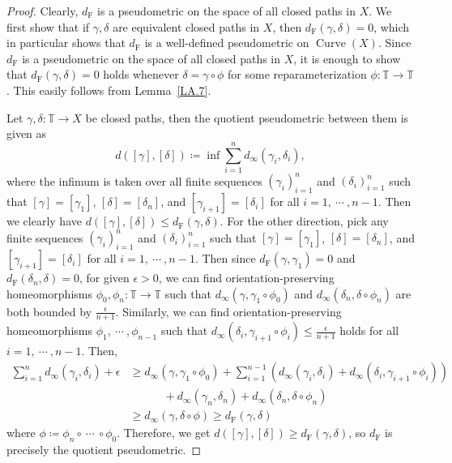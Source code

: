 \documentclass[reqno,centertags,12pt]{amsart}
\theoremstyle{definition}
\numberwithin{equation}{section}
\newcommand{\seq}[1]{\left( #1 \right)}
\newcommand{\bbT}{{\mathbb{T}}}
\begin{document}
\begin{proof}
	Clearly, $d_{\mathrm{F}}$ is a pseudometric on the space of all closed paths in $X$.
	We first show that if $\gamma,\delta$ are equivalent closed paths in $X$, then
	$d_{\mathrm{F}}(\gamma,\delta) = 0$, which in particular shows that $d_{\mathrm{F}}$ is
	a well-defined pseudometric on $\operatorname{Curve}(X)$.
	Since $d_{\mathrm{F}}$ is a pseudometric on the space of all closed paths in $X$,
	it is enough to show that $d_{\mathrm{F}}(\gamma,\delta) = 0$ holds whenever
	$\delta = \gamma\circ\phi$ for some reparameterization $\phi\colon\bbT\to\bbT$.
	This easily follows from Lemma~\ref{LA.7}.

	Let $\gamma,\delta\colon\bbT\to X$ be closed paths, then the quotient pseudometric
	between them is given as
	\[
		d([\gamma],[\delta])\coloneqq \inf \sum_{i=1}^{n}d_{\infty}(\gamma_{i},\delta_{i}),
	\]
	where the infimum is taken over all finite sequences $\seq{\gamma_{i}}_{i=1}^{n}$
	and $\seq{\delta_{i}}_{i=1}^{n}$ such that $[\gamma]=[\gamma_{1}]$,
	$[\delta]=[\delta_{n}]$, and $[\gamma_{i+1}]=[\delta_{i}]$ for all $i=1,\ \cdots\ ,n-1$.
	Then we clearly have $d([\gamma],[\delta])\leq d_{\mathrm{F}}(\gamma,\delta)$.
	For the other direction, pick any finite sequences $\seq{\gamma_{i}}_{i=1}^{n}$ and
	$\seq{\delta_{i}}_{i=1}^{n}$ such that $[\gamma]=[\gamma_{1}]$, $[\delta]=[\delta_{n}]$,
	and $[\gamma_{i+1}]=[\delta_{i}]$ for all $i=1,\ \cdots\ ,n-1$.
	Then since $d_{\mathrm{F}}(\gamma,\gamma_{1}) = 0$
	and $d_{\mathrm{F}}(\delta_{n},\delta) = 0$, for given $\epsilon>0$, we can find
	orientation-preserving homeomorphisms $\phi_{0},\phi_{n}\colon\bbT\to\bbT$ such that
	$d_{\infty}(\gamma,\gamma_{1}\circ\phi_{0})$ and
	$d_{\infty}(\delta_{n},\delta\circ\phi_{n})$ are
	both bounded by $\frac{\epsilon}{n+1}$. Similarly, we can find orientation-preserving
	homeomorphisms $\phi_{1},\ \cdots\ ,\phi_{n-1}$ such that
	$d_{\infty}(\delta_{i},\gamma_{i+1}\circ\phi_{i}) \leq \frac{\epsilon}{n+1}$ holds
	for all $i=1,\ \cdots\ ,n-1$. Then,
	\begin{align*}
		\sum_{i=1}^{n}d_{\infty}(\gamma_{i},\delta_{i}) + \epsilon &\geq
		d_{\infty}(\gamma,\gamma_{1}\circ\phi_{0}) +
		\sum_{i=1}^{n-1}\left(
			d_{\infty}(\gamma_{i},\delta_{i})
			+ d_{\infty}(\delta_{i},\gamma_{i+1}\circ\phi_{i})
		\right)
		\\&\quad\quad\quad
		+ d_{\infty}(\gamma_{n},\delta_{n}) + d_{\infty}(\delta_{n},\delta\circ\phi_{n}) \\
		&\geq d_{\infty}(\gamma,\delta\circ\phi) \geq d_{\mathrm{F}}(\gamma,\delta)
	\end{align*}
	where $\phi\coloneqq\phi_{n}\circ\ \cdots\ \circ\phi_{0}$.
	Therefore, we get $d([\gamma],[\delta])\geq d_{\mathrm{F}}(\gamma,\delta)$, so
	$d_{\mathrm{F}}$ is precisely the quotient pseudometric.


\end{proof}
\end{document}
